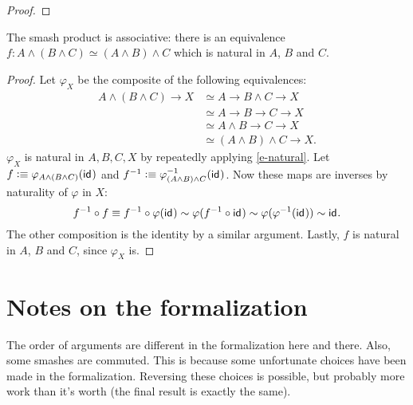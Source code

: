 \documentclass{article}
\renewcommand{\smash}{\wedge}
\renewcommand{\phi}{\varphi}
\renewcommand{\o}{\ensuremath{\circ}}
\newcommand{\sy}{^{-1}}
\begin{document}
\begin{proof}
\end{proof}

\begin{thm}
  The smash product is associative: there is an equivalence $f : A \smash (B \smash C) \simeq (A \smash B) \smash C$ which is natural in $A$, $B$ and $C$.
\end{thm}
\begin{proof}
  Let $\phi_X$ be the composite of the following equivalences:
  \begin{align*}
    A \smash (B \smash C)\to X&\simeq A \to B\smash C\to X\\
    &\simeq A \to B\to C\to X\\
    &\simeq A \smash B\to C\to X\\
    &\simeq (A \smash B)\smash C\to X.
  \end{align*}
  $\phi_X$ is natural in $A,B,C,X$ by repeatedly applying \autoref{e-natural}. Let
  $f\defeq\phi_{A \smash (B \smash C)}(\idfunc)$ and
  $f\sy\defeq\phi\sy_{(A \smash B) \smash C}(\idfunc)$. Now these maps are inverses by naturality of
  $\phi$ in $X$:
  $$f\sy\o f\equiv f\sy\o \phi(\idfunc)\sim \phi(f\sy\o\idfunc)\sim \phi(\phi\sy(\idfunc))\sim\idfunc.$$
  The other composition is the identity by a similar argument. Lastly, $f$ is natural in $A$, $B$
  and $C$, since $\phi_X$ is.
\end{proof}

\section{Notes on the formalization}

The order of arguments are different in the formalization here and there.
Also, some smashes are commuted. This is because some unfortunate choices have been made in the formalization. Reversing these choices is possible, but probably more work than it's worth (the final result is exactly the same).
\end{document}
